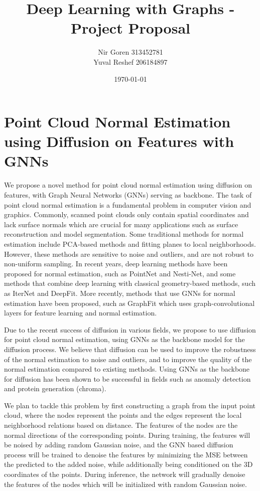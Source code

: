 \documentclass{article}
\title{Deep Learning with Graphs - Project Proposal}
\author{Nir Goren 313452781 \\ Yuval Reshef 206184897}
\date{\today}
\begin{document}
\maketitle

\section{Point Cloud Normal Estimation using Diffusion on Features with GNNs}
We propose a novel method for point cloud normal estimation using diffusion on features, with Graph Neural Networks (GNNs) serving as backbone.
The task of point cloud normal estimation is a fundamental problem in computer vision and graphics. Commonly, scanned point clouds only contain spatial coordinates and lack surface normals which are crucial for many applications such as surface reconstruction and model segmentation. Some traditional methods for normal estimation include PCA-based methods and fitting planes to local neighborhoods. However, these methods are sensitive to noise and outliers, and are not robust to non-uniform sampling. In recent years, deep learning methods have been proposed for normal estimation, such as PointNet and Nesti-Net, and some methods that combine deep learning with classical geometry-based methods, such as IterNet and DeepFit. More recently, methods that use GNNs for normal estimation have been proposed, such as GraphFit which uses graph-convolutional layers for feature learning and normal estimation.

Due to the recent success of diffusion in various fields, we propose to use diffusion for point cloud normal estimation, using GNNs as the backbone model for the diffusion process. We believe that diffusion can be used to improve the robustness of the normal estimation to noise and outliers, and to improve the quality of the normal estimation compared to existing methods. Using GNNs as the backbone for diffusion has been shown to be successful in fields such as anomaly detection and protein generation (chroma).

We plan to tackle this problem by first constructing a graph from the input point cloud, where the nodes represent the points and the edges represent the local neighborhood relations based on distance.
The features of the nodes are the normal directions of the corresponding points. During training, the features will be noised by adding random Gaussian noise, and the GNN based diffusion process will be trained to denoise the features by minimizing the MSE between the predicted to the added noise, while additionally being conditioned on the 3D coordinates of the points. During inference, the network will gradually denoise the features of the nodes which will be initialized with random Gaussian noise.
\end{document}
